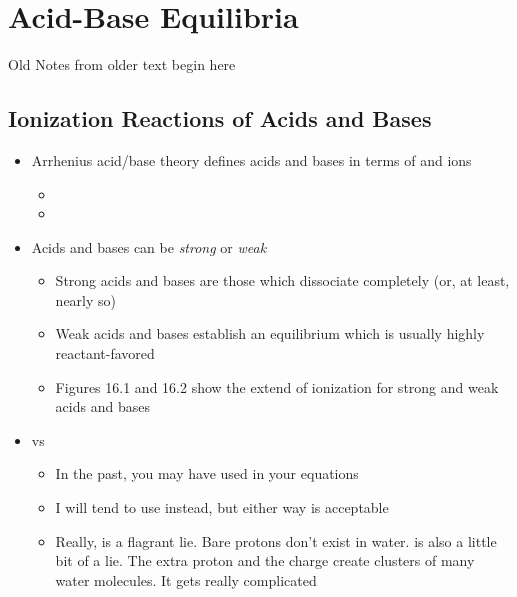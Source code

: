 \documentclass[12pt, openany, letterpaper]{memoir}
\begin{document}
\chapter{Acid-Base Equilibria}

{\HUGE Old Notes from older text begin here}
\section{Ionization Reactions of Acids and Bases}
\begin{itemize}
	\item Arrhenius acid/base theory defines acids and bases in terms of  and  ions
	\begin{itemize}
		\item {}
		\item {}
	\end{itemize}
	\item Acids and bases can be \emph{strong} or \emph{weak}
	\begin{itemize}
		\item Strong acids and bases are those which dissociate completely (or, at least, nearly so) 
		\item Weak acids and bases establish an equilibrium which is usually highly reactant-favored
		\item Figures 16.1 and 16.2 show the extend of ionization for strong and weak acids and bases
	\end{itemize}
	\item {} vs 
	\begin{itemize}
		\item In the past, you may have used  in your equations
		\item I will tend to use  instead, but either way is acceptable
		\item Really,  is a flagrant lie. Bare protons don't exist in water.  is also a little bit of a lie. The extra proton and the charge create clusters of many water molecules. It gets really complicated
	\end{itemize}
\end{itemize}
\end{document}
